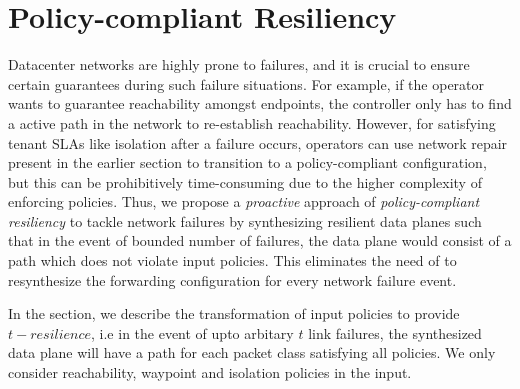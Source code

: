 \section{Policy-compliant Resiliency}
Datacenter networks are highly prone to failures, 
and it is crucial to ensure certain guarantees during such failure
situations. For example, if the operator wants to guarantee
reachability amongst endpoints, the controller only has to find a active
path in the network to re-establish reachability. 
However, for satisfying tenant SLAs like isolation after a failure occurs,
operators can use network repair present in the earlier section to
transition to a policy-compliant configuration, but this
can be prohibitively time-consuming due to the higher complexity
of enforcing policies. 
Thus, we propose a \emph{proactive} approach 
of \emph{policy-compliant resiliency} to tackle network failures
by synthesizing resilient data planes such that in the event
of bounded number of failures, the data plane would consist of a 
path which does not violate input policies. This eliminates the 
need of \name to resynthesize the forwarding
configuration for every network failure event.

In the section, we describe the transformation of input 
policies to provide $t-resilience$, i.e in the event of upto arbitary
$t$ link failures, the synthesized data plane will have a path
for each packet class  satisfying all policies. We only consider reachability, waypoint
and isolation policies in the input. 

